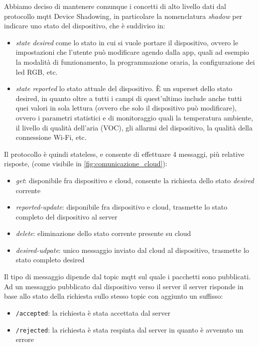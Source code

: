 \documentclass[12pt,a4paper,twoside,titlepage]{book}
\begin{document}
Abbiamo deciso di mantenere comunque i concetti di alto livello dati dal protocollo \Gls{mqtt}
Device Shadowing, in particolare la nomenclatura \textit{shadow} per indicare uno stato del
dispositivo, che è suddiviso in:
\begin{itemize}
    \item \textit{state desired} come lo stato in cui si vuole portare il dispositivo, ovvero le
        impostazioni che l'utente può modificare agendo dalla app, quali ad esempio la modalità di funzionamento,
        la programmazione oraria, la configurazione dei \acrshort{led} RGB, etc.
    \item \textit{state reported} lo stato attuale del dispositivo. È un superset dello stato
        desired, in quanto oltre a tutti i campi di quest'ultimo include anche tutti quei valori
        in sola lettura (ovvero che solo il dispositivo può modificare), ovvero i parametri
        statistici e di monitoraggio quali la temperatura ambiente, il livello di qualità dell'aria (VOC),
        gli allarmi del dispositivo, la qualità della connessione Wi-Fi, etc.
\end{itemize}

Il protocollo è quindi stateless, e consente di effettuare 4 messaggi, più relative risposte,
(come visibile in \autoref{fig:comunicazione_cloud}):

\begin{itemize}
    \item \textit{get}: disponibile fra dispositivo e cloud, consente la richiesta dello stato \textit{desired} corrente
    \item \textit{reported-update}: disponibile fra dispositivo e cloud, trasmette lo stato
        completo del dispositivo al server
    \item \textit{delete}: eliminazione dello stato corrente presente su cloud
    \item \textit{desired-udpate}: unico messaggio inviato dal cloud al dispositivo,
        trasmette lo stato completo desired
\end{itemize}

Il tipo di messaggio dipende dal \gls{topic} \Gls{mqtt} sul quale i pacchetti sono pubblicati. Ad
un messaggio pubblicato dal dispositivo verso il server il server risponde in base allo
stato della richiesta sullo stesso \gls{topic} con aggiunto un suffisso:
\begin{itemize}
    \item \texttt{/accepted}: la richiesta è stata accettata dal server
    \item \texttt{/rejected}: la richiesta è stata respinta dal server in quanto è
        avvenuto un errore
\end{itemize}
\end{document}
